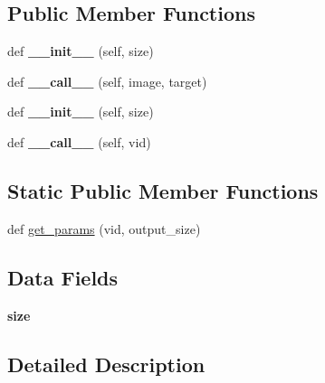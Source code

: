 \subsection*{Public Member Functions}
\begin{DoxyCompactItemize}
\item 
\mbox{\label{classtransforms_1_1RandomCrop_a2a07110411aea0d6f3c58e501b298a27}} 
def {\bfseries \+\_\+\+\_\+init\+\_\+\+\_\+} (self, size)
\item 
\mbox{\label{classtransforms_1_1RandomCrop_adb41e312d2aa952ad1dbe97fc8c1d1e9}} 
def {\bfseries \+\_\+\+\_\+call\+\_\+\+\_\+} (self, image, target)
\item 
\mbox{\label{classtransforms_1_1RandomCrop_a2a07110411aea0d6f3c58e501b298a27}} 
def {\bfseries \+\_\+\+\_\+init\+\_\+\+\_\+} (self, size)
\item 
\mbox{\label{classtransforms_1_1RandomCrop_aed037cf4bd2af3788a77a62b07d86ef0}} 
def {\bfseries \+\_\+\+\_\+call\+\_\+\+\_\+} (self, vid)
\end{DoxyCompactItemize}
\subsection*{Static Public Member Functions}
\begin{DoxyCompactItemize}
\item 
def \hyperlink{classtransforms_1_1RandomCrop_ac45dd69d66ab4cf5531d82bc7512b7ce}{get\+\_\+params} (vid, output\+\_\+size)
\end{DoxyCompactItemize}
\subsection*{Data Fields}
\begin{DoxyCompactItemize}
\item 
\mbox{\label{classtransforms_1_1RandomCrop_a6a9ef269f1251485c0f735d7ad042a80}} 
{\bfseries size}
\end{DoxyCompactItemize}


\subsection{Detailed Description}


